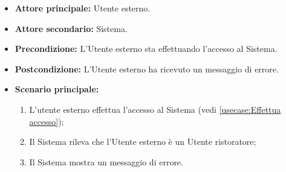 \label{usecase:Errore utente ristoratore}
\begin{itemize}
	\item \textbf{Attore principale:} Utente esterno.
	\item \textbf{Attore secondario:} Sistema.
	\item \textbf{Precondizione:} L'Utente esterno sta effettuando l'accesso al
	      Sistema.
	\item \textbf{Postcondizione:} L'Utente esterno ha ricevuto un messaggio di errore.
	\item \textbf{Scenario principale:}
	      \begin{enumerate}
		      \item L'utente esterno effettua l'accesso al Sistema (vedi \autoref{usecase:Effettua accesso});
		      \item Il Sistema rileva che l'Utente esterno è un Utente ristoratore;
		      \item Il Sistema mostra un messaggio di errore.
	      \end{enumerate}
\end{itemize}
